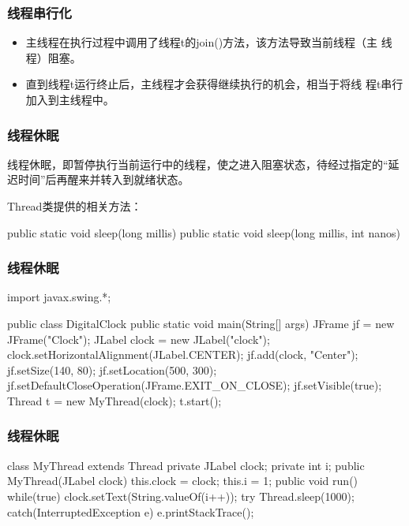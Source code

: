 \begin{frame}[fragile] %
\frametitle{线程串行化}
\begin{itemize}
\item 主线程在执行过程中调用了线程t的join()方法，该方法导致当前线程（主
  线程）阻塞。
\item 直到线程t运行终止后，主线程才会获得继续执行的机会，相当于将线
  程t串行加入到主线程中。
\end{itemize}
\end{frame}

\begin{frame}[fragile] %
\frametitle{线程休眠}
线程休眠，即暂停执行当前运行中的线程，使之进入阻塞状态，待经过指定的“延
迟时间”后再醒来并转入到就绪状态。

Thread类提供的相关方法：
\begin{javaCode}
public static void sleep(long millis)
public static void sleep(long millis, int nanos)
\end{javaCode}
\end{frame}

\begin{frame}[fragile] %
\frametitle{线程休眠}
\begin{javaCode}
import javax.swing.*;

public class DigitalClock {
  public static void main(String[] args) {
    JFrame jf = new JFrame("Clock");
    JLabel clock = new JLabel("clock");
    clock.setHorizontalAlignment(JLabel.CENTER);
    jf.add(clock, "Center");
    jf.setSize(140, 80);
    jf.setLocation(500, 300);
    jf.setDefaultCloseOperation(JFrame.EXIT_ON_CLOSE);
    jf.setVisible(true);
    Thread t = new MyThread(clock);
    t.start();
  }
}
\end{javaCode}
\end{frame}

\begin{frame}[fragile] %
\frametitle{线程休眠}
\begin{javaCode}
class MyThread extends Thread {
  private JLabel clock;
  private int i;
  public MyThread(JLabel clock) {
    this.clock = clock;
    this.i = 1;
  }
  public void run() {
    while(true) {
      clock.setText(String.valueOf(i++));
      try {
        Thread.sleep(1000);
      } catch(InterruptedException e) {
        e.printStackTrace();
      }
    }
  }
}  
\end{javaCode}
\end{frame}

